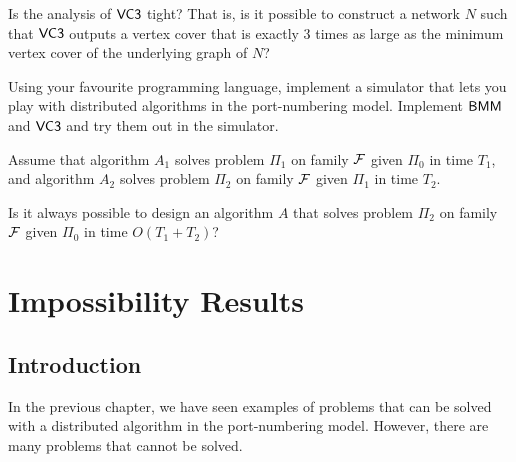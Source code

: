 \begin{ex}\label{ex:vc3tight}
    Is the analysis of $\textsf{VC3}$ tight? That is, is it possible to construct a network $N$ such that $\textsf{VC3}$ outputs a vertex cover that is exactly $3$ times as large as the minimum vertex cover of the underlying graph of $N$?
\end{ex}

\begin{ex}[implementation]\label{ex:simulator}
    Using your favourite programming language, implement a simulator that lets you play with distributed algorithms in the port-numbering model. Implement $\textsf{BMM}$ and $\textsf{VC3}$ and try them out in the simulator.
\end{ex}

\begin{ex}[composition]\label{ex:composition}
    Assume that algorithm $A_1$ solves problem $\Pi_1$ on family $\mathcal{F}$ given $\Pi_0$ in time $T_1$, and algorithm $A_2$ solves problem $\Pi_2$ on family $\mathcal{F}$ given $\Pi_1$ in time $T_2$.
    
    Is it always possible to design an algorithm $A$ that solves problem $\Pi_2$ on family $\mathcal{F}$ given $\Pi_0$ in time $O(T_1 + T_2)$?
    
\end{ex}


\chapter{Impossibility Results}

\section{Introduction}\label{sec:neg-intro}

In the previous chapter, we have seen examples of problems that can be solved with a distributed algorithm in the port-numbering model. However, there are many problems that cannot be solved.


